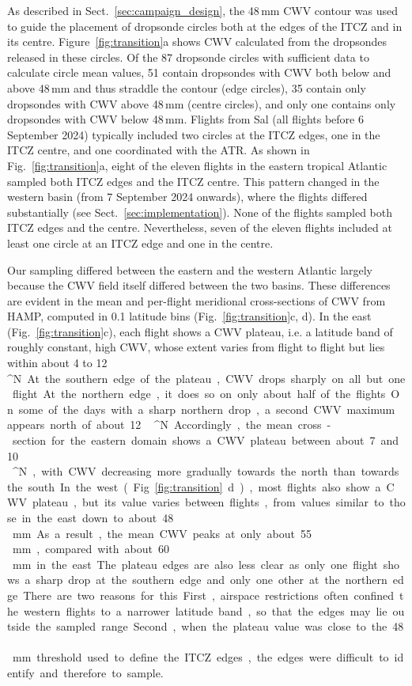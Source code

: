 \documentclass[acp, manuscript]{copernicus}
\begin{document}
As described in Sect.~\ref{sec:campaign_design}, the 48\,\unit{mm} CWV contour was used to guide the placement of dropsonde circles both at the edges of the ITCZ and in its centre.
Figure~\ref{fig:transition}a shows CWV calculated from the dropsondes released in these circles.
Of the 87 dropsonde circles with sufficient data to calculate circle mean values, 51 contain dropsondes with CWV both below and above 48\,\unit{mm} and thus straddle the contour (edge circles), 35 contain only dropsondes with CWV above 48\,\unit{mm} (centre circles), and only one contains only dropsondes with CWV below 48\,\unit{mm}.
Flights from Sal (all flights before 6 September 2024) typically included two circles at the ITCZ edges, one in the ITCZ centre, and one coordinated with the ATR. As shown in Fig.~\ref{fig:transition}a, eight of the eleven flights in the eastern tropical Atlantic sampled both ITCZ edges and the ITCZ centre.
This pattern changed in the western basin (from 7 September 2024 onwards), where the flights differed substantially (see Sect.~\ref{sec:implementation}). None of the flights sampled both ITCZ edges and the centre. Nevertheless, seven of the eleven flights included at least one circle at an ITCZ edge and one in the centre.

Our sampling differed between the eastern and the western Atlantic largely because the CWV field itself differed between the two basins.
These differences are evident in the mean and per-flight meridional cross-sections of CWV from HAMP, computed in 0.1\textdegree{} latitude bins (Fig.~\ref{fig:transition}c, d).
In the east (Fig.~\ref{fig:transition}c), each flight shows a CWV plateau, i.e. a latitude band of roughly constant, high CWV, whose extent varies from flight to flight but lies within about 4 to 12\,\unit{^{\circ}N}.
At the southern edge of the plateau, CWV drops sharply on all but one flight.
At the northern edge, it does so on only about half of the flights.
On some of the days with a sharp northern drop, a second CWV maximum appears north of about 12\,\unit{^{\circ}N}.
Accordingly, the mean cross-section for the eastern domain shows a CWV plateau between about 7 and 10\,\unit{^{\circ}N}, with CWV decreasing more gradually towards the north than towards the south.

In the west (Fig.~\ref{fig:transition}d), most flights also show a CWV plateau, but its value varies between flights, from values similar to those in the east down to about 48\,\unit{mm}.
As a result, the mean CWV peaks at only about 55\,\unit{mm}, compared with about 60\,\unit{mm} in the east.
The plateau edges are also less clear as only one flight shows a sharp drop at the southern edge and only one other at the northern edge.
There are two reasons for this.
First, airspace restrictions often confined the western flights to a narrower latitude band, so that the edges may lie outside the sampled range.
Second, when the plateau value was close to the 48\,\unit{mm} threshold used to define the ITCZ edges, the edges were difficult to identify and therefore to sample.
\end{document}
